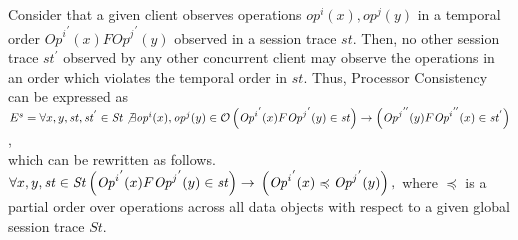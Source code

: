 \documentclass{sig-alternate-05-2015}
\begin{document}
Consider that a given client observes operations ${\mathit{op}^i}(x), {\mathit{op}^j}(y)$ in a temporal order ${\mathit{Op}^i}^{'}(x) F {\mathit{Op}^j}^{'} (y)$ observed in a session trace $\mathit{st}$. Then, no other session trace $\mathit{st}^{'}$ observed by any other concurrent client may observe the operations in an order which violates the temporal order in $\mathit{st}$. Thus, Processor Consistency can be expressed as 
  \\ $E^s = \forall x, y, \mathit{st}, \mathit{st}^{'} \in \mathit{St} \not\exists {\mathit{op}^i}(x), {\mathit{op}^j}(y) \in \mathcal{O} \\
 \left( {\mathit{Op}^i}^{'}(x) F {\mathit{Op}^j}^{'} (y) \in \mathit{st} \right) \rightarrow \left( {\mathit{Op}^j}^{''}(y) F {\mathit{Op}^i}^{''} (x) \in \mathit{st}^{'} \right)$,   \\
 which can be rewritten as follows.
$\forall x, y, \mathit{st} \in \mathit{St} \\ \left( {\mathit{Op}^i}^{'}(x) F {\mathit{Op}^j}^{'} (y) \in \mathit{st} \right) \rightarrow \\ \left( {\mathit{Op}^i}^{'}(x) \preccurlyeq {\mathit{Op}^j}^{'} (y) \right),$  where $ \preccurlyeq$ is a partial order over operations across all data objects with respect to a given global session trace $ \mathit{St}$. %
\end{document}
